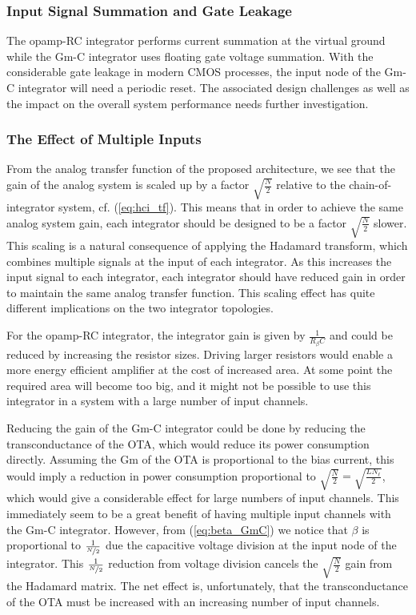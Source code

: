 \subsubsection*{Input Signal Summation and Gate Leakage}
The opamp-RC integrator performs current summation at the virtual ground while the Gm-C integrator uses floating gate voltage summation. With the considerable gate leakage in modern CMOS processes, the input node of the Gm-C integrator will need a periodic reset. The associated design challenges as well as the impact on the overall system performance needs further investigation.

\subsubsection*{The Effect of Multiple Inputs}
From the analog transfer function of the proposed architecture, we see that the gain of the analog system is scaled up by a factor $\sqrt{\frac{N}{2}}$ relative to the chain-of-integrator system, cf. (\ref{eq:hci_tf}). This means that in order to achieve the same analog system gain, each integrator should be designed to be a factor $\sqrt{\frac{N}{2}}$ slower. This scaling is a natural consequence of applying the Hadamard transform, which combines multiple signals at the input of each integrator. As this increases the input signal to each integrator, each integrator should have reduced gain in order to maintain the same analog transfer function. This scaling effect has quite different implications on the two integrator topologies.

For the opamp-RC integrator, the integrator gain is given by $\frac{1}{R_\beta C}$ and could be reduced by increasing the resistor sizes. Driving larger resistors would enable a more energy efficient amplifier at the cost of increased area. At some point the required area will become too big, and it might not be possible to use this integrator in a system with a large number of input channels.

Reducing the gain of the Gm-C integrator could be done by reducing the transconductance of the OTA, which would reduce its power consumption directly. Assuming the Gm of the OTA is proportional to the bias current, this would imply a reduction in power consumption proportional to $\sqrt{\frac{N}{2}} = \sqrt{\frac{LN_\ell}{2}}$, which would give a considerable effect for large numbers of input channels. This immediately seem to be a great benefit of having multiple input channels with the Gm-C integrator. However, from (\ref{eq:beta_GmC}) we notice that $\beta$ is proportional to $\frac{1}{\nicefrac{N}{2}}$ due the capacitive voltage division at the input node of the integrator. This $\frac{1}{\nicefrac{N}{2}}$ reduction from voltage division cancels the $\sqrt{\frac{N}{2}}$ gain from the Hadamard matrix. The net effect is, unfortunately, that the transconductance of the OTA must be increased with an increasing number of input channels.


